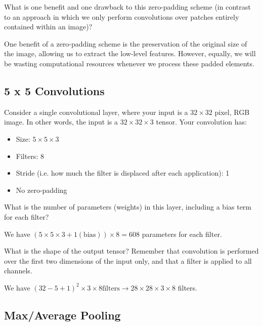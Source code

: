 What is one benefit and one drawback to this zero-padding scheme (in contrast to an approach in which we only perform convolutions over patches entirely contained within an image)?

\begin{solution}
 One benefit of a zero-padding scheme is the preservation of the original size of the image, allowing us to extract the low-level features. However, equally, we will be wasting computational resources whenever we process these padded elements. 
\end{solution}

\subsection{5 x 5 Convolutions}

Consider a single convolutional layer, where your input is a $32 \times 32$ pixel, RGB image. In other words, the input is a $32 \times 32 \times 3$ tensor. Your convolution has:

\begin{itemize}
\item Size: $5 \times 5 \times 3$
\item Filters: 8
\item Stride (i.e. how much the filter is displaced after each application): 1
\item No zero-padding
\end{itemize}

\problem[2] What is the number of parameters (weights) in this layer, including a bias term for each filter?

\begin{subsolution}
 We have $(5\times 5\times3 +1 (\text{bias}))\times 8=608$ parameters for each filter.
\end{subsolution}

\problem[3] What is the shape of the output tensor? Remember that convolution is performed over the first two dimensions of the input only, and that a filter is applied to all channels.

\begin{subsolution}
 We have $(32-5+1)^2\times 3 \times 8 \text{filters} \rightarrow 28\times28\times3 \times 8$ filters.
\end{subsolution}

 \subsection{Max/Average Pooling}

